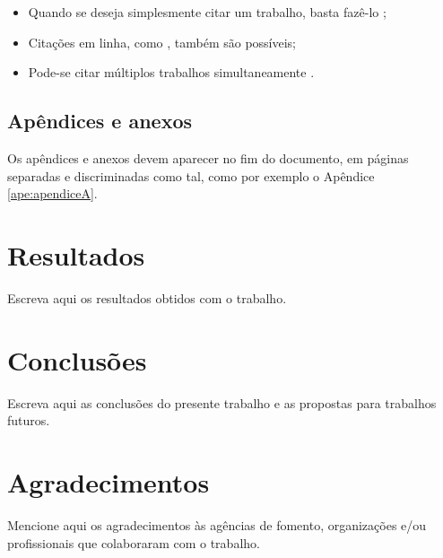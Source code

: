 \documentclass[conference,harvard,brazil,english]{icttcc}
\begin{document}
\begin{itemize}
\item Quando se deseja simplesmente citar um trabalho, basta fazê-lo  \cite{gustafson};

\item Citações em linha, como \cite{marquardt1963}, também são possíveis;

\item Pode-se citar múltiplos trabalhos simultaneamente \cite{ljung1999,gustafson}.

\end{itemize}

\subsection{Apêndices e anexos}
Os apêndices e anexos devem aparecer no fim do documento, em páginas separadas e discriminadas como tal, como por exemplo o Apêndice \ref{ape:apendiceA}.

\section{Resultados}
 Escreva aqui os resultados obtidos com o trabalho.


\section{Conclusões} 

Escreva aqui as conclusões do presente trabalho e as propostas para trabalhos futuros.


\section*{Agradecimentos}
Mencione aqui os agradecimentos às agências de fomento, organizações e/ou profissionais que colaboraram com o trabalho.





\end{document}
